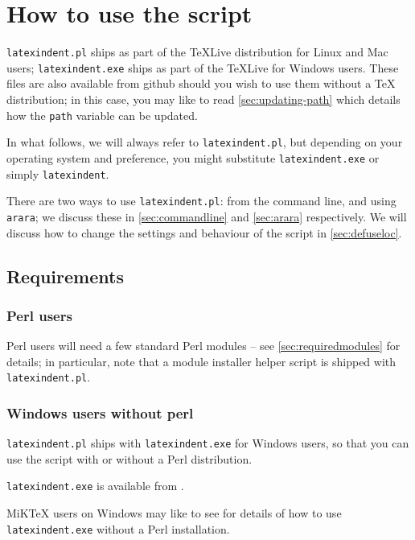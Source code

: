 \section{How to use the script}\label{sec:how:to:use}
 \texttt{latexindent.pl} ships as part of the \TeX Live distribution for
 Linux and Mac users; \texttt{latexindent.exe} ships as part of the \TeX Live for Windows
 users. These files are also available from github \cite{latexindent-home} should you wish
 to use them without a \TeX{} distribution; in this case, you may like to read
 \vref{sec:updating-path} which details how the \texttt{path} variable can be updated.

 In what follows, we will always refer to \texttt{latexindent.pl}, but depending on your
 operating system and preference, you might substitute \texttt{latexindent.exe} or simply
 \texttt{latexindent}.

 There are two ways to use \texttt{latexindent.pl}: from the command line, and using
 \texttt{arara}; we discuss these in \cref{sec:commandline} and \cref{sec:arara}
 respectively. We will discuss how to change the settings and behaviour of the script in
 \vref{sec:defuseloc}.

\subsection{Requirements}
\subsubsection{Perl users}
 Perl users will need a few standard Perl modules -- see \vref{sec:requiredmodules} for
 details;  in particular, note
 that a module installer helper script is shipped with \texttt{latexindent.pl}.%

\subsubsection{Windows users without perl}\label{subsubsec:latexindent:exe}
 \texttt{latexindent.pl} ships with \texttt{latexindent.exe} for Windows
 users, so that you can use the script with or without a Perl distribution.

 \texttt{latexindent.exe} is available from \cite{latexindent-home}.

 MiKTeX users on Windows may like to see \cite{miktex-guide} for details of how to use
 \texttt{latexindent.exe} without a Perl installation. 
  

